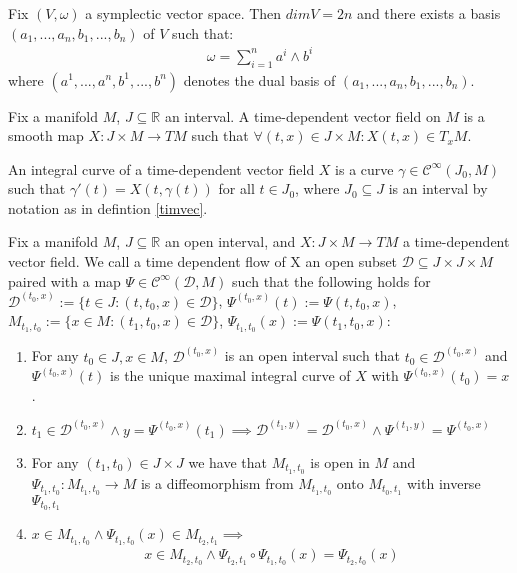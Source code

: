 \begin{theorem} \label{canform} \cite{ybaehn}
Fix $(V,\omega)$ a symplectic vector space. Then $dimV = 2n$ and there exists a basis $(a_1,...,a_n,b_1, ...,b_n)$ of $V$ such that:
\begin{align*}
\omega = \sum^n_{i=1} a^i \wedge b^i
\end{align*}
where $(a^1, ... , a^n,b^1, ... ,b^n)$ denotes the dual basis of $(a_1,...,a_n,b_1, ...,b_n)$.
\end{theorem}

\begin{definition} \cite{lee1} \label{timvec}
Fix a manifold $M$, $J \subseteq \mathbb{R}$ an interval. A time-dependent vector field on $M$ is a smooth map $X: J \times M \to TM$ such that $\forall (t,x) \in J \times M: X(t,x) \in T_x M$.
\end{definition}

\begin{definition} \cite{lee1}
An integral curve of a time-dependent vector field $X$ is a curve $\gamma \in \mathcal{C}^\infty(J_0,M)$ such that $\gamma '(t) = X(t,\gamma(t))$ for all $t \in J_0$, where $J_0 \subseteq J$ is an interval by notation as in defintion \ref{timvec}.
\end{definition}

\begin{definition} \cite{lee1}
Fix a manifold $M$, $J \subseteq \mathbb{R}$ an open interval, and $X : J\times M \to TM$ a time-dependent vector field. We call a time dependent flow of X an open subset $\mathcal{D} \subseteq J \times J \times M$ paired with a map $\Psi \in \mathcal{C}^\infty(\mathcal{D},M)$ such that the following holds for $\mathcal{D}^{(t_0,x)} := \{t\in J: (t,t_0,x) \in \mathcal{D} \}$, $\Psi^{(t_0,x)}(t) := \Psi(t,t_0,x)$, $M_{t_1,t_0} := \{ x \in M:(t_1,t_0,x) \in \mathcal{D} \}$, $\Psi_{t_1,t_0}(x):= \Psi(t_1,t_0,x)$:
\begin{enumerate}
\item For any $t_0 \in J, x \in M$, $\mathcal{D}^{(t_0,x)}$ is an open interval such that $t_0 \in \mathcal{D}^{(t_0,x)}$ and $\Psi^{(t_0,x)}(t)$ is the unique maximal integral curve of $X$ with $\Psi^{(t_0,x)}(t_0) = x$.
\item $t_1 \in \mathcal{D}^{(t_0,x)} \land y = \Psi^{(t_0,x)}(t_1) \implies \mathcal{D}^{(t_1,y)} = \mathcal{D}^{(t_0,x)} \land \Psi^{(t_1,y)} = \Psi^{(t_0,x)}$
\item For any $(t_1,t_0) \in J \times J$ we have that $M_{t_1,t_0}$ is open in $M$ and $\Psi_{t_1,t_0}: M_{t_1,t_0} \to M$ is a diffeomorphism from $M_{t_1,t_0}$ onto $M_{t_0,t_1}$ with inverse $\Psi_{t_0,t_1}$
\item $x \in M_{t_1,t_0} \land \Psi_{t_1,t_0}(x) \in M_{t_2,t_1} \implies$
\begin{align*}
x \in M_{t_2,t_0} \land \Psi_{t_2,t_1} \circ \Psi_{t_1,t_0}(x) = \Psi_{t_2, t_0}(x)
\end{align*}
\end{enumerate}
\end{definition}

